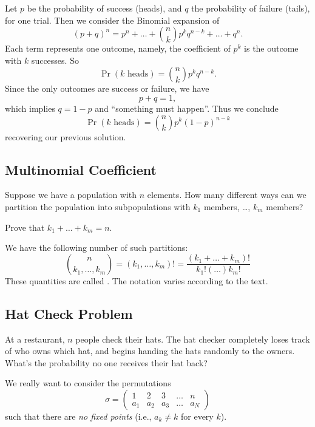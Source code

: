 Let $p$ be the probability of success (heads), and $q$ the probability
of failure (tails), for one trial. Then we consider the Binomial
expansion of 
\begin{equation}
(p+q)^{n}=p^{n}+\dots+\binom{n}{k}p^{k}q^{n-k}+\dots+q^{n}.
\end{equation}
Each term represents one outcome, namely, the coefficient of $p^{k}$ is
the outcome with $k$ successes. So
\begin{equation}
\Pr(\mbox{$k$ heads})=\binom{n}{k}p^{k}q^{n-k}.
\end{equation}
Since the only outcomes are success or failure, we have
\begin{equation}
p+q=1,
\end{equation}
which implies $q=1-p$ and ``something must happen''. Thus we conclude
\begin{equation}
\Pr(\mbox{$k$ heads})=\binom{n}{k}p^{k}(1-p)^{n-k}
\end{equation}
recovering our previous solution.

\subsection{Multinomial Coefficient}
\M
Suppose we have a population with $n$ elements. How many different ways
can we partition the population into subpopulations with $k_1$
members, \dots, $k_m$ members?

\begin{xca}
Prove that $k_1+\dots+k_m=n$.
\end{xca}

We have the following number of such partitions:
\begin{equation}
\binom{n}{k_1,\dots,k_m} = (k_1,\dots,k_m)! = \frac{(k_1+\dots+k_m)!}{k_1!(\dots)k_m!}
\end{equation}
These quantities are called .
The notation varies according to the text. 

\subsection{Hat Check Problem}\label{subsec:hatCheckProblem}
At a restaurant, $n$ people check their hats.
The hat checker completely loses track of who owns which hat, and begins
handing the hats randomly to the owners. What's the probability no one
receives their hat back?

\M
We really want to consider the permutations
\begin{equation}
\sigma = \begin{pmatrix} 1 & 2 & 3 & \dots & n\\
a_1 & a_2 & a_3 & \dots & a_N
\end{pmatrix}
\end{equation}
such that there are \emph{no fixed points} (i.e., $a_{k}\neq k$ for
every $k$).


